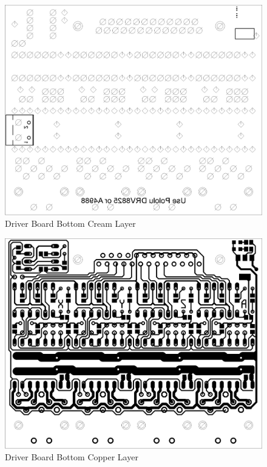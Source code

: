 \begin{figure}[h]
	\centering
	\includegraphics[width=1\textwidth]{pcb-design/bottomcream.png}
	\caption{Driver Board Bottom Cream Layer}
	\label{fig:driver-bottom-cream}
\end{figure}
\begin{figure}[h]
	\centering
	\includegraphics[width=1\textwidth]{pcb-design/bottomroute.png}
	\caption{Driver Board Bottom Copper Layer}
	\label{fig:driver-bottom-copper}
\end{figure}